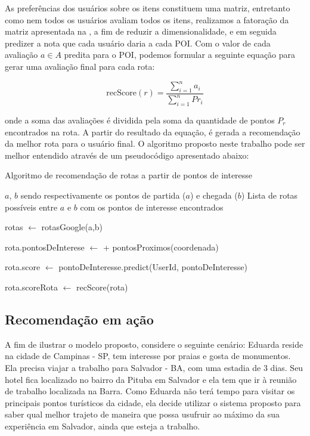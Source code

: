 \documentclass[portuguese]{textolivre}
\begin{document}
As preferências dos usuários sobre os itens constituem uma matriz, entretanto como nem todos os usuários avaliam todos os itens, realizamos a fatoração da matriz apresentada na , a fim de reduzir a dimensionalidade, e em seguida predizer a nota que cada usuário daria a cada POI. Com o valor de cada avaliação $a \in A$ predita para o POI, podemos formular a seguinte equação para gerar uma avaliação final para cada rota: 

\begin{equation}
\label{eq:recscore}
    \mbox{recScore}(r) = \frac{\sum_{i=1}^{n}a_i}{\sum_{i=1}^{n}Pr_i}
\end{equation}

onde a soma das avaliações é dividida pela soma da quantidade de pontos $P_r$ encontrados na rota. A partir do resultado da equação, é gerada a recomendação da melhor rota para o usuário final. O algoritmo proposto neste trabalho pode ser melhor entendido através de um pseudocódigo apresentado abaixo:

\begin{algorithm}[H]
 \caption{Algoritmo de recomendação de rotas a partir de pontos de interesse}
 \label{alg:obtencao_rotas}
 \begin{algorithmic}[1]
 
 \renewcommand{\algorithmicrequire}{\textbf{Entrada:}}
 \renewcommand{\algorithmicensure}{\textbf{Saída:}}
 
 \REQUIRE $a$, $b$ sendo respectivamente os pontos de partida ($a$) e chegada ($b$)
 \ENSURE Lista de rotas possíveis entre $a$ e $b$ com os pontos de interesse encontrados 
 
 \STATE rotas $\leftarrow$ rotasGoogle(a,b)
        \item {rota.pontosDeInterese $\leftarrow$ + pontosProximos(coordenada)}
    \ENDFOR
    \ENDFOR
    
        \item {rota.score $\leftarrow$  pontoDeInteresse.predict(UserId, pontoDeInteresse)}
    \ENDFOR
      \item {rota.scoreRota $\leftarrow$ recScore(rota)}
    \ENDFOR
 \end{algorithmic} 
 \end{algorithm}
 
\subsection{Recomendação em ação}\label{sec:recomendation_in_action}
A fim de ilustrar o modelo proposto, considere o seguinte cenário: Eduarda reside na cidade de Campinas - SP, tem interesse por praias e gosta de monumentos. Ela precisa viajar a trabalho para Salvador - BA, com uma estadia de 3 dias. Seu hotel fica localizado no bairro da Pituba em Salvador e ela tem que ir à reunião de trabalho localizada na Barra. Como Eduarda não terá tempo para visitar os principais pontos turísticos da cidade, ela decide utilizar o sistema proposto para saber qual melhor trajeto de maneira que possa usufruir ao máximo da sua experiência em Salvador, ainda que esteja a trabalho.
\end{document}
